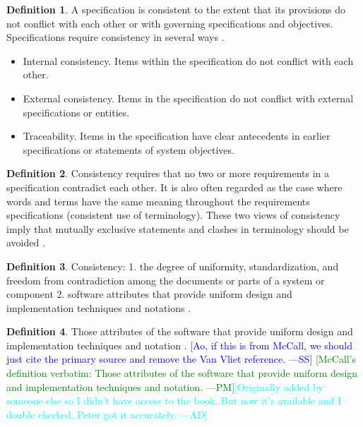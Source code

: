 \documentclass[letterpaper,cleveref]{lipics-v2019}
\newcommand{\authornote}[3]{\textcolor{#1}{[#3 ---#2]}}
\newcommand{\authornote}[3]{}
\newcommand{\wss}[1]{\authornote{blue}{SS}{#1}} %
\newcommand{\pmi}[1]{\authornote{green}{PM}{#1}} %
\newcommand{\ad}[1]{\authornote{cyan}{AD}{#1}} %
\theoremstyle{definition}
\newtheorem{defn}{Definition}
\begin{document}
\begin{defn}
  \label{ConsistencySelected}
  A specification is consistent to the extent that its provisions do not
  conflict with each other or with governing specifications and
  objectives. Specifications require consistency in several ways
  \citep{Boehm1984}.
  \begin{itemize}
  \item Internal consistency. Items within the specification do not conflict
    with each other.
  \item External consistency. Items in the specification do not conflict with
    external specifications or entities.
  \item Traceability. Items in the specification have clear antecedents in
    earlier specifications or statements of system objectives.
  \end{itemize}
\end{defn}

\begin{defn}
  Consistency requires that no two or more requirements in a specification
  contradict each other. It is also often regarded as the case where words and
  terms have the same meaning throughout the requirements specifications
  (consistent use of terminology). These two views of consistency imply that
  mutually exclusive statements and clashes in terminology should be avoided
  \citep{ZOWGHI2003}.
\end{defn}
\begin{defn}
  Consistency: 1. the degree of uniformity, standardization, and freedom from
  contradiction among the documents or parts of a system or component
  2. software attributes that provide uniform design and implementation
  techniques and notations \citep{ISO/IEC/IEEE24765}.
\end{defn}

\begin{defn}
  Those attributes of the software that provide uniform design and 
  implementation techniques and notation \citep{McCallEtAl1977}.  \wss{Ao, if 
  this is from McCall, we should just cite
    the primary source and remove the Van Vliet reference.} \pmi{McCall's 
    definition verbatim: Those attributes of the software that provide uniform 
    design and implementation techniques and notation.}\ad{Originally added 
  by someone else so I didn't have access to the book. But now it's available 
  and I double checked, Peter got it accurately.}
\end{defn}
\end{document}
